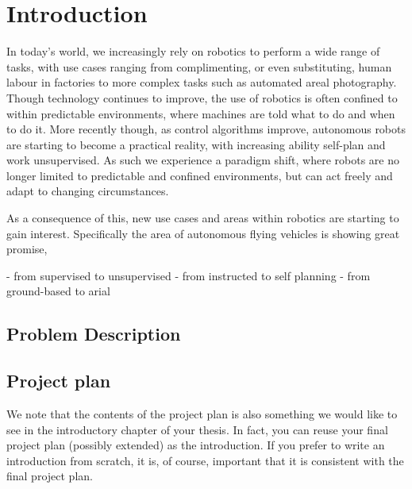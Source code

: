 \chapter{Introduction}

In today's world, we increasingly rely on robotics to perform a wide range of tasks, with use cases ranging from complimenting, or even substituting, human labour in factories to more complex tasks such as automated areal photography. 
Though technology continues to improve, the use of robotics is often confined to within predictable environments, where machines are told what to do and when to do it. 
More recently though, as control algorithms improve, autonomous robots are starting to become a practical reality, with increasing ability self-plan and work unsupervised. 
As such we experience a paradigm shift, where robots are no longer limited to predictable and confined environments, but can act freely and adapt to changing circumstances. 

As a consequence of this, new use cases and areas within robotics are starting to gain interest. 
Specifically the area of autonomous flying vehicles is showing great promise, 

- from supervised to unsupervised
- from instructed to self planning
- from ground-based to arial
\section{Problem Description}




\section{Project plan}
We note that the contents of the project plan is also something we would like to see in the introductory chapter of your thesis. In fact, you can reuse your final project plan (possibly extended) as the introduction. If you prefer to write an introduction from scratch, it is, of course, important that it is consistent with the final project plan.



%
%

